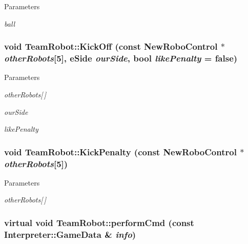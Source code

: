 \begin{DoxyParams}{Parameters}
\item[{\em ball}]\end{DoxyParams}
\hypertarget{classTeamRobot_a162c8b33d4315a61d8371dc9a923b37b}{
\subsubsection[{KickOff}]{\setlength{\rightskip}{0pt plus 5cm}void TeamRobot::KickOff (const {\bf NewRoboControl} $\ast$ {\em otherRobots}\mbox{[}5\mbox{]}, \/  eSide {\em ourSide}, \/  bool {\em likePenalty} = {\ttfamily false})}}
\label{classTeamRobot_a162c8b33d4315a61d8371dc9a923b37b}

\begin{DoxyParams}{Parameters}
\item[{\em otherRobots\mbox{[}$\,$\mbox{]}}]\item[{\em ourSide}]\item[{\em likePenalty}]\end{DoxyParams}
\hypertarget{classTeamRobot_ad5755055df84960c8d1a0a40efe33668}{
\subsubsection[{KickPenalty}]{\setlength{\rightskip}{0pt plus 5cm}void TeamRobot::KickPenalty (const {\bf NewRoboControl} $\ast$ {\em otherRobots}\mbox{[}5\mbox{]})}}
\label{classTeamRobot_ad5755055df84960c8d1a0a40efe33668}

\begin{DoxyParams}{Parameters}
\item[{\em otherRobots\mbox{[}$\,$\mbox{]}}]\end{DoxyParams}
\hypertarget{classTeamRobot_a9b84df51ca16a7203fdb6498ea6741da}{
\subsubsection[{performCmd}]{\setlength{\rightskip}{0pt plus 5cm}virtual void TeamRobot::performCmd (const {\bf Interpreter::GameData} \& {\em info})}}
\label{classTeamRobot_a9b84df51ca16a7203fdb6498ea6741da}


